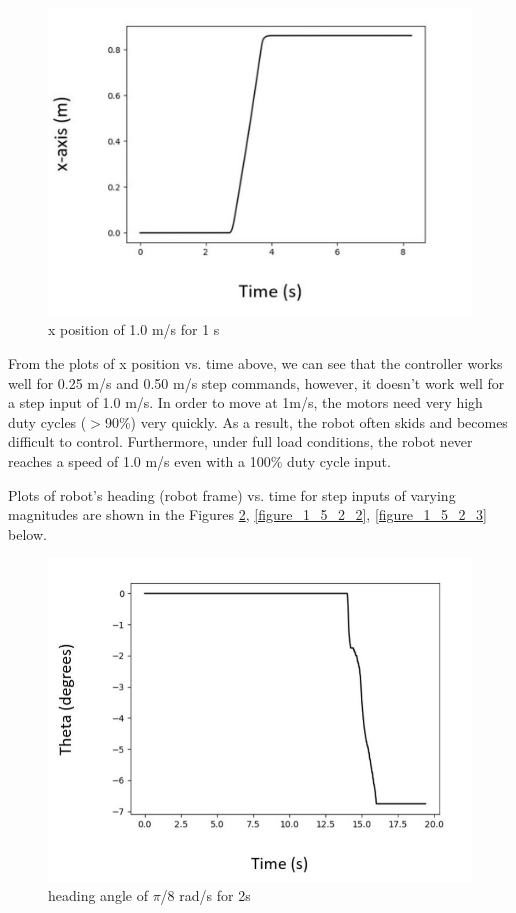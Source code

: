 \documentclass[journal]{IEEEtran}
\begin{document}
\begin{figure}[H]
\begin{center}
\includegraphics[width=0.8\linewidth]{image_1/figure_1_5_1_3.jpg}
\end{center}
   \caption{x position of 1.0 m/s for 1 s}
   \label{figure_1_5_1_3}
\end{figure}


From the plots of x position vs. time above, we can see that the controller works well for 0.25 m/s and 0.50 m/s step commands, however, it doesn’t work well for a step input of 1.0 m/s. In order to move at 1m/s, the motors need very high duty cycles ($>$90\%) very quickly. As a result, the robot often skids and becomes difficult to control. Furthermore, under full load conditions, the robot never reaches a speed of 1.0 m/s even with a 100\% duty cycle input.

Plots of robot’s heading (robot frame) vs. time for step inputs of varying magnitudes are shown in the Figures \ref{figure_1_5_2_1}, \ref{figure_1_5_2_2}, \ref{figure_1_5_2_3} below.

\begin{figure}[h]
\begin{center}
\includegraphics[width=0.77\linewidth]{image_1/figure_1_5_2_1.jpg}
\end{center}
   \caption{heading angle of $\pi$/8 rad/s for 2s}
   \label{figure_1_5_2_1}
\end{figure}
\end{document}
